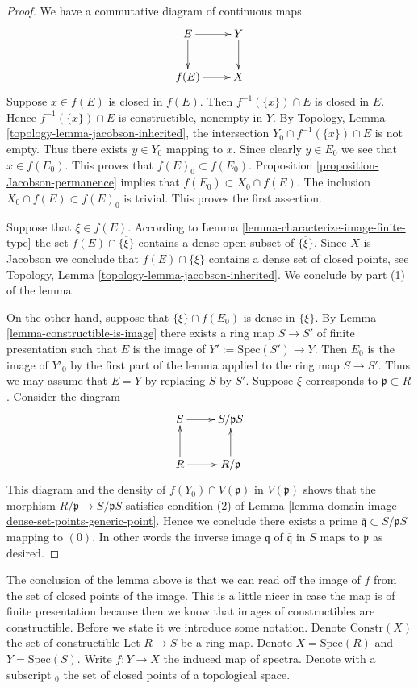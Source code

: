 \begin{proof}
We have a commutative diagram of continuous maps
$$
\xymatrix{
E \ar[r] \ar[d] & Y \ar[d] \cr
f(E) \ar[r] & X
}
$$
Suppose $x \in f(E)$ is closed in $f(E)$. Then $f^{-1}(\{x\})\cap E$
is closed in $E$. Hence $f^{-1}(\{x\})\cap E$ is constructible, nonempty
in $Y$. By Topology, Lemma \ref{topology-lemma-jacobson-inherited},
the intersection $Y_0 \cap f^{-1}(\{x\})\cap E$ is not empty.
Thus there exists $y \in Y_0$ mapping to $x$.
Since clearly $y \in E_0$ we see that $x \in f(E_0)$.
This proves that $f(E)_0 \subset f(E_0)$.
Proposition \ref{proposition-Jacobson-permanence} implies that
$f(E_0) \subset X_0 \cap f(E)$. The inclusion
$X_0 \cap f(E) \subset f(E)_0$ is trivial. This proves the
first assertion.

\medskip\noindent
Suppose that $\xi \in f(E)$. According to
Lemma \ref{lemma-characterize-image-finite-type}
the set $f(E) \cap \overline{\{\xi\}}$ contains a dense
open subset of $\overline{\{\xi\}}$. Since $X$ is Jacobson
we conclude that $f(E) \cap \overline{\{\xi\}}$ contains a
dense set of closed points, see Topology,
Lemma \ref{topology-lemma-jacobson-inherited}.
We conclude by part (1) of the lemma.

\medskip\noindent
On the other hand, suppose that $\overline{\{\xi\}} \cap f(E_0)$
is dense in $\overline{\{\xi\}}$. By
Lemma \ref{lemma-constructible-is-image}
there exists a ring map $S \to S'$ of finite presentation
such that $E$ is the image of $Y' := \text{Spec}(S') \to Y$.
Then $E_0$ is the image of $Y'_0$ by the first part of the
lemma applied to the ring map $S \to S'$. Thus we may assume that
$E = Y$ by replacing $S$ by $S'$. Suppose $\xi$ corresponds
to $\mathfrak p \subset R$. Consider the diagram
$$
\xymatrix{
S \ar[r] & S/\mathfrak p S \cr
R \ar[r] \ar[u] & R/\mathfrak p \ar[u]
}
$$
This diagram and the density of $f(Y_0) \cap V(\mathfrak p)$
in $V(\mathfrak p)$
shows that the morphism $R/\mathfrak p \to S/\mathfrak p S$
satisfies condition (2) of
Lemma \ref{lemma-domain-image-dense-set-points-generic-point}.
Hence we conclude
there exists a prime $\overline{\mathfrak q} \subset S/\mathfrak pS$
mapping to $(0)$. In other words the inverse image $\mathfrak q$
of $\overline{\mathfrak q}$ in $S$ maps to $\mathfrak p$ as desired.
\end{proof}

\noindent
The conclusion of the lemma above is that we can read off
the image of $f$ from the set of closed points of the image.
This is a little nicer in case the map is of finite presentation
because then we know that images of constructibles are constructible.
Before we state it we introduce some notation.
Denote $\text{Constr}(X)$ the set of constructible
Let $R \to S$ be a ring map.
Denote $X = \text{Spec}(R)$ and $Y = \text{Spec}(S)$.
Write $f : Y \to X$ the induced map of spectra.
Denote with a subscript ${}_0$ the set
of closed points of a topological space.


